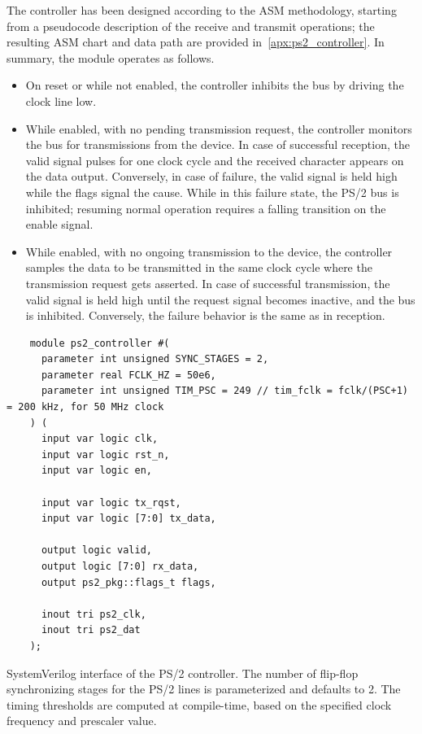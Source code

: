 \documentclass[]{article}
\begin{document}
\begin{description}
    The controller has been designed according to the ASM methodology, starting from a pseudocode description of the receive and transmit operations; the resulting ASM chart and data path are provided in~\cref{apx:ps2_controller}. In summary, the module operates as follows.
    \begin{itemize}
        \item On reset or while not enabled, the controller inhibits the bus by driving the clock line low.
        \item While enabled, with no pending transmission request, the controller monitors the bus for transmissions from the device. In case of successful reception, the valid signal pulses for one clock cycle and the received character appears on the data output. Conversely, in case of failure, the valid signal is held high while the flags signal the cause. While in this failure state, the PS/2 bus is inhibited; resuming normal operation requires a falling transition on the enable signal.
        \item While enabled, with no ongoing transmission to the device, the controller samples the data to be transmitted in the same clock cycle where the transmission request gets asserted. In case of successful transmission, the valid signal is held high until the request signal becomes inactive, and the bus is inhibited. Conversely, the failure behavior is the same as in reception.
    \end{itemize}

    \begin{listing}
    \begin{verbatim}
    module ps2_controller #(
      parameter int unsigned SYNC_STAGES = 2,
      parameter real FCLK_HZ = 50e6,
      parameter int unsigned TIM_PSC = 249 // tim_fclk = fclk/(PSC+1) = 200 kHz, for 50 MHz clock
    ) (
      input var logic clk,
      input var logic rst_n,
      input var logic en,
    
      input var logic tx_rqst,
      input var logic [7:0] tx_data,
    
      output logic valid,
      output logic [7:0] rx_data,
      output ps2_pkg::flags_t flags,
    
      inout tri ps2_clk,
      inout tri ps2_dat
    );
    \end{verbatim}
    \caption{SystemVerilog interface of the PS/2 controller. The number of flip-flop synchronizing stages for the PS/2 lines is parameterized and defaults to 2. The timing thresholds are computed at compile-time, based on the specified clock frequency and prescaler value.}
    \label{lst:ps2_controller}
    \end{listing}


\end{description}
\end{document}
